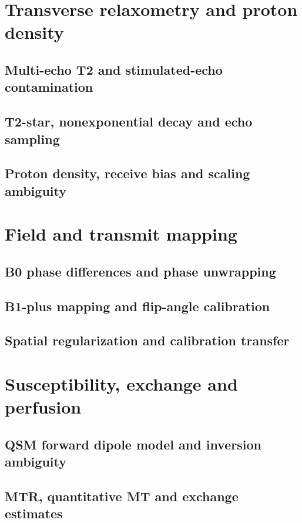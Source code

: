 \section{Transverse relaxometry and proton density}
\label{sec:11:transverse-relaxometry-and-proton-density}
\subsection{Multi-echo T2 and stimulated-echo contamination}
\subsection{T2-star, nonexponential decay and echo sampling}
\subsection{Proton density, receive bias and scaling ambiguity}

\section{Field and transmit mapping}
\label{sec:11:field-and-transmit-mapping}
\subsection{B0 phase differences and phase unwrapping}
\subsection{B1-plus mapping and flip-angle calibration}
\subsection{Spatial regularization and calibration transfer}

\section{Susceptibility, exchange and perfusion}
\label{sec:11:susceptibility-exchange-and-perfusion}
\subsection{QSM forward dipole model and inversion ambiguity}
\subsection{MTR, quantitative MT and exchange estimates}
